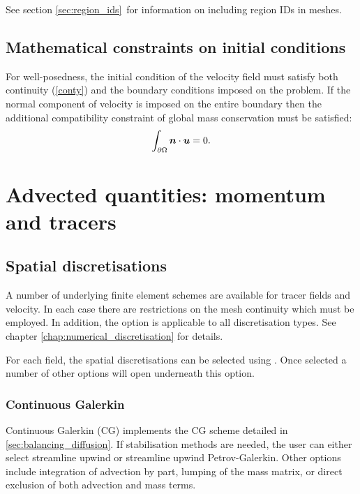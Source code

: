 See section \ref{sec:region_ids}\ for information on including region IDs
in meshes.

\subsection{Mathematical constraints on initial conditions}\label{sec:ICs}

For well-posedness, the initial condition of the velocity field must
satisfy both continuity (\ref{conty}) and the boundary conditions
imposed on the problem. If the normal component of velocity is
imposed on the entire boundary then the additional
compatibility constraint of global mass conservation must be
satisfied:
\begin{equation*}
\int_{\partial\Omega}{\mbox{\boldmath$n$}}\cdot{\mbox{\boldmath$u$}}=0.
\end{equation*}

\section{Advected quantities: momentum and tracers}
\label{config:spatial}

\subsection{Spatial discretisations}\label{sec:Spatial discretisations}

A number of underlying finite element schemes are available for tracer
fields and velocity. In each case there are restrictions on the mesh
continuity which must be employed. In addition, the \onlypdf\linebreak
{} option is applicable to all discretisation
types. See chapter \ref{chap:numerical_discretisation} for details.

For each field, the spatial discretisations can be selected using
.  Once selected a number
of other options will open underneath this option.

\subsubsection{Continuous Galerkin}
\label{sec:configuring_fluidity_continuous_galerkin}

Continuous Galerkin (CG) implements the CG scheme detailed in \ref{sec:balancing_diffusion}. If stabilisation methods are needed, the user can either select streamline upwind or streamline upwind Petrov-Galerkin. Other options include integration of advection by part, lumping of the mass matrix, or direct exclusion of both advection and mass terms.

